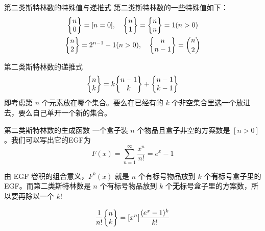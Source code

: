 \documentclass[UTF8]{beamer}
\begin{document}
    \begin{frame}{第二类斯特林数的特殊值与递推式}
        第二类斯特林数的一些特殊值如下：
        \begin{gather*}
        \St{n}{0} = [n=0],\quad \St{n}{1}=\St{n}{n} = 1(n>0)\\ 
        \St{n}{2} = 2^{n-1}-1(n>0),\quad \St{n}{n-1} = \binom{n}{2}
        \end{gather*}
        \pause

        \begin{block}{第二类斯特林数的递推式}
        $$
        \St nk = k\St {n-1}k+\St{n-1}{k-1}
        $$
        即考虑第 $n$ 个元素放在哪个集合。要么在已经有的 $k$ 个非空集合里选一个放进去，要么自己单开一个新的集合。
        \end{block}
    \end{frame}
    
    \begin{frame}{第二类斯特林数的生成函数}
        \pause
        一个盒子装 $n$ 个物品且盒子非空的方案数是 $[n>0]$。我们可以写出它的EGF为 
        $$
        F(x)= \sum_{n=1}^{\infty}\frac{x^n}{n!}=e^x-1
        $$
        
        由 EGF 卷积的组合意义，$F^k(x)$ 就是 $n$ 个有标号物品放到 $k$ 个\textbf{有}标号盒子里的EGF。而第二类斯特林数是 $n$ 个有标号物品放到 $k$ 个\textbf{无}标号盒子里的方案数，所以要再除以一个 $k!$

        $$
        \frac{1}{n!}\St nk = [x^n]\frac{(e^x-1)^k}{k!}
        $$
    \end{frame}
\end{document}
